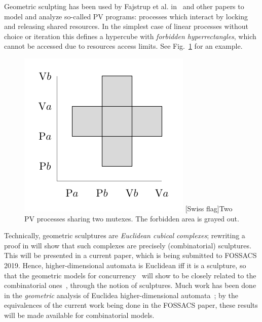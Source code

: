     Geometric sculpting has been used by Fajstrup et al. in~\cite{Fajstrup06AlgebraicTopologyConcurrency, Fajstrup98detectingdeadlocks, Fajstrup16DirectedAlgebraicTopologyConcurrency} and other papers to model and analyze so-called PV programs: processes which interact by locking and releasing shared resources.  In the simplest case of linear processes without choice or iteration this defines a hypercube with \emph{forbidden hyperrectangles}, which cannot be accessed due to resources access limits.  See Fig.~\ref{fig:swiss} for an example.
    
    \begin{figure}[ht]
        \centering
        \includegraphics[scale=1.2]{Figures/6.Conclusion/swiss.pdf}
        [Swiss flag]{Two PV processes sharing two mutexes.  The forbidden area is
    grayed out.}
        \label{fig:swiss}
    \end{figure}
    
    Technically, geometric sculptures are \emph{Euclidean cubical complexes}; rewriting a proof in \cite{Ziemianski17} will show that such complexes are precisely (combinatorial) sculptures. This will be presented in a current paper, which is being submitted to FOSSACS 2019. Hence, higher-dimensional automata is Euclidean iff it is a sculpture, so that the geometric models for concurrency~\cite{Fajstrup06AlgebraicTopologyConcurrency, Fajstrup98detectingdeadlocks, Fajstrup16DirectedAlgebraicTopologyConcurrency} will show to be closely related to the combinatorial ones~\cite{pratt91hda, Glabbeek91BismiluationHDA}, through the notion of sculptures. Much work has been done in the \emph{geometric} analysis of Euclidea higher-dimensional automata~\cite{FajstrupRGH04FundCatI, GoubaultH07FundCatII, Fajstrup98detectingdeadlocks, MeshulamR17, RaussenZ14, Ziemianski17}; by the equivalences of the current work being done in the FOSSACS paper, these results will be made available for combinatorial models.
    
